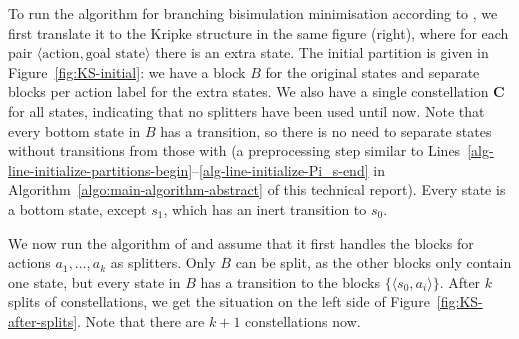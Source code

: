 \documentclass[a4paper,10pt]{article}
\theoremstyle{definition}
\theoremstyle{plain}
\begin{document}
To run the algorithm for branching bisimulation minimisation according to \cite{GJKW2017},
we first translate it to the Kripke structure in the same figure (right),
where for each pair $\langle \text{action}, \text{goal state} \rangle$ there is an extra state.
The initial partition is given in Figure~\ref{fig:KS-initial}:
we have a block $B$ for the original states and separate blocks per action label for the extra states.
We also have a single constellation $\mathbf{C}$ for all states, indicating that no splitters have been used until now.
Note that every bottom state in $B$ has a transition, so there is no need to separate states without transitions from those with
(a preprocessing step similar to Lines~\ref{alg-line-initialize-partitions-begin}--\ref{alg-line-initialize-Pi_s-end} in Algorithm~\ref{algo:main-algorithm-abstract} of this technical report).
Every state is a bottom state, except $s_1$, which has an inert transition to $s_0$.

We now run the algorithm of \cite{GJKW2017} and assume that it first handles the blocks for actions $a_1, \ldots, a_k$ as splitters.
Only $B$ can be split, as the other blocks only contain one state,
but every state in $B$ has a transition to the blocks $\{ \langle s_0, a_i \rangle \}$.
After $k$ splits of constellations, we get the situation on the left side of Figure~\ref{fig:KS-after-splits}.
Note that there are $k+1$ constellations now.
\end{document}
